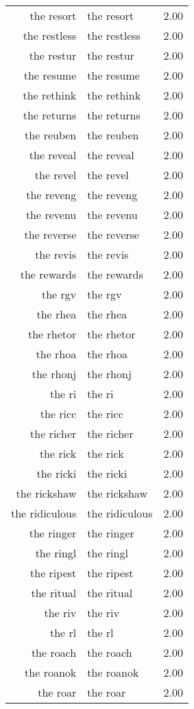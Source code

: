 \begin{table}[ht]
\begin{tabular}{rlr}
  the resort & the resort & 2.00 \\ 
  the restless & the restless & 2.00 \\ 
  the restur & the restur & 2.00 \\ 
  the resume & the resume & 2.00 \\ 
  the rethink & the rethink & 2.00 \\ 
  the returns & the returns & 2.00 \\ 
  the reuben & the reuben & 2.00 \\ 
  the reveal & the reveal & 2.00 \\ 
  the revel & the revel & 2.00 \\ 
  the reveng & the reveng & 2.00 \\ 
  the revenu & the revenu & 2.00 \\ 
  the reverse & the reverse & 2.00 \\ 
  the revis & the revis & 2.00 \\ 
  the rewards & the rewards & 2.00 \\ 
  the rgv & the rgv & 2.00 \\ 
  the rhea & the rhea & 2.00 \\ 
  the rhetor & the rhetor & 2.00 \\ 
  the rhoa & the rhoa & 2.00 \\ 
  the rhonj & the rhonj & 2.00 \\ 
  the ri & the ri & 2.00 \\ 
  the ricc & the ricc & 2.00 \\ 
  the richer & the richer & 2.00 \\ 
  the rick & the rick & 2.00 \\ 
  the ricki & the ricki & 2.00 \\ 
  the rickshaw & the rickshaw & 2.00 \\ 
  the ridiculous & the ridiculous & 2.00 \\ 
  the ringer & the ringer & 2.00 \\ 
  the ringl & the ringl & 2.00 \\ 
  the ripest & the ripest & 2.00 \\ 
  the ritual & the ritual & 2.00 \\ 
  the riv & the riv & 2.00 \\ 
  the rl & the rl & 2.00 \\ 
  the roach & the roach & 2.00 \\ 
  the roanok & the roanok & 2.00 \\ 
  the roar & the roar & 2.00 \\ 

\end{tabular}
\end{table}
